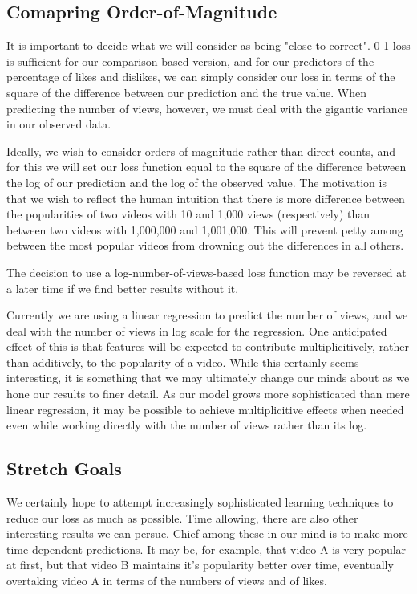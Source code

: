 \documentclass{article} %
\begin{document}
\subsection{Comapring Order-of-Magnitude}

It is important to decide what we will consider as being "close to correct".  0-1 loss is sufficient for our comparison-based version, and for our predictors of the percentage of likes and dislikes, we can simply consider our loss in terms of the square of the difference between our prediction and the true value.  When predicting the number of views, however, we must deal with the gigantic variance in our observed data.

Ideally, we wish to consider orders of magnitude rather than direct counts, and for this we will set our loss function equal to the square of the difference between the log of our prediction and the log of the observed value.  The motivation is that we wish to reflect the human intuition that there is more difference between the popularities of two videos with 10 and 1,000 views (respectively) than between two videos with 1,000,000 and 1,001,000.  This will prevent petty among between the most popular videos from drowning out the differences in all others.

The decision to use a log-number-of-views-based loss function may be reversed at a later time if we find better results without it.

Currently we are using a linear regression to predict the number of views, and we deal with the number of views in log scale for the regression.  One anticipated effect of this is that features will be expected to contribute multiplicitively, rather than additively, to the popularity of a video.  While this certainly seems interesting, it is something that we may ultimately change our minds about as we hone our results to finer detail.  As our model grows more sophisticated than mere linear regression, it may be possible to achieve multiplicitive effects when needed even while working directly with the number of views rather than its log.

\subsection{Stretch Goals}

We certainly hope to attempt increasingly sophisticated learning techniques to reduce our loss as much as possible.  Time allowing, there are also other interesting results we can persue.  Chief among these in our mind is to make more time-dependent predictions.  It may be, for example, that video A is very popular at first, but that video B maintains it's popularity better over time, eventually overtaking video A in terms of the numbers of views and of likes.
\end{document}
